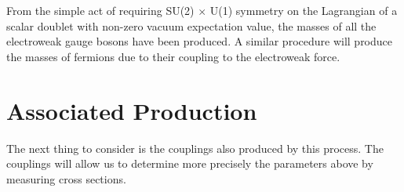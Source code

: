 From the simple act of requiring SU(2) $\times$ U(1) symmetry on the Lagrangian of a scalar
doublet with non-zero vacuum expectation value,
the masses of all the electroweak gauge bosons have been produced.
A similar procedure will produce the masses of fermions due to their
coupling to the electroweak force. 

\section{Associated Production}

The next thing to consider is the couplings also produced by this process.
The couplings will allow us to determine more precisely the parameters above
by measuring cross sections.

